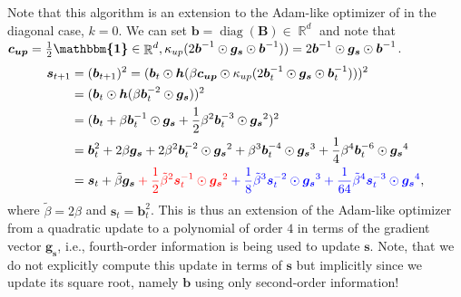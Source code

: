 \documentclass[a4paper, 11pt, oneside]{scrartcl}
\theoremstyle{break}
\DeclareMathOperator{\Real}{\mathbb{R}}
\DeclareMathOperator{\diag}{diag}
\newcommand{\matr}[1]{\boldsymbol{#1}}
\numberwithin{equation}{section}
\begin{document}
				Note that this algorithm is an extension to the Adam-like optimizer of \parencite{LSK20} in the diagonal case, $k = 0$.
				We can set $\matr{b} = \diag(\matr{B}) \in \Real^d$ and note that $\matr{c_{up}} = \frac{1}{2} \matr{\mathbbm{1}} \in \Real^d, \kappa_{up}(2\matr{b}^{-1} \odot \matr{g_s} \odot \matr{b}^{-1})) = 2 \matr{b}^{-1} \odot \matr{g_s} \odot \matr{b}^{-1}$.
				\begin{align*}
					\matr{s}_{t+1} & = (\matr{b}_{t+1})^2 = (\matr{b}_t \odot \matr{h}(\beta \matr{c_{up}} \odot \kappa_{up} (2 \matr{b}_t^{-1} \odot \matr{g_s} \odot \matr{b}_t^{-1})))^2 \\
					&= (\matr{b}_t \odot \matr{h}(\beta \matr{b}_t^{-2} \odot \matr{g_s}))^2 \\
					&= (\matr{b}_t + \beta \matr{b}_t^{-1} \odot \matr{g_s} + \frac{1}{2} \beta^2 \matr{b}_t^{-3} \odot \matr{g_s}^2)^2 \\
					&= \matr{b}_t^2 + 2\beta \matr{g_s} + 2 \beta^2 \matr{b}_t^{-2} \odot \matr{g_s}^2 + \beta^3 \matr{b}_t^{-4} \odot \matr{g_s}^3 + \frac{1}{4} \beta^4 \matr{b}_t^{-6} \odot \matr{g_s}^4 \\
					&= \matr{s}_t + \tilde{\beta} \matr{g_s} \color{red} + \frac{1}{2} \tilde{\beta}^2 \matr{s}_t^{-1} \odot \matr{g_s}^2 \color{blue} + \frac{1}{8} \tilde{\beta}^3 \matr{s}_t^{-2} \odot \matr{g_s}^3 + \frac{1}{64} \tilde{\beta}^4 \matr{s}_t^{-3} \odot \matr{g_s}^4 \color{black},
				\end{align*}
				where $\tilde{\beta} = 2 \beta$ and $\matr{s}_t = \matr{b}_t^2$.
				This is thus an extension of the Adam-like optimizer from a quadratic update to a polynomial of order $4$ in terms of the gradient vector $\matr{g_s}$, i.e., fourth-order information is being used to update $\matr{s}$. 
				Note, that we do not explicitly compute this update in terms of $\matr{s}$ but implicitly since we update its square root, namely $\matr{b}$ using only second-order information!
\end{document}

